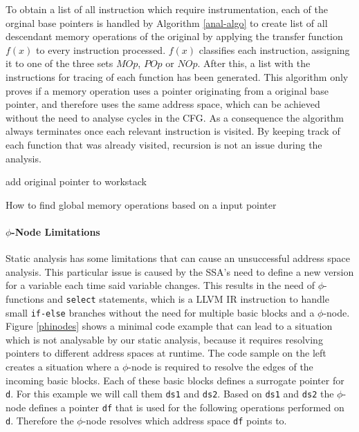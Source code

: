 To obtain a list of all instruction which require instrumentation, each of the orginal base pointers is handled by Algorithm \ref{anal-algo} to create list of all descendant memory operations of the original by applying the transfer function $f(x)$ to every instruction processed. $f(x)$ classifies each instruction, assigning it to one of the three sets $MOp$, $POp$ or $NOp$. After this, a list with the instructions for tracing of each function has been generated. This algorithm only proves if a memory operation uses a pointer originating from a original base pointer, and therefore uses the same address space, which can be achieved without the need to analyse cycles in the CFG. As a consequence the algorithm always terminates once each relevant instruction is visited. By keeping track of each function that was already visited, recursion is not an issue during the analysis.


\begin{algorithm}[t]
add original pointer to workstack\;
\caption{How to find global memory operations based on a input pointer}
\label{anal-algo}
\end{algorithm}
\paragraph{$\phi$-Node Limitations}\label{patho}
Static analysis has some limitations that can cause an unsuccessful address space analysis. This particular issue is caused by the SSA's need to define a new version for a variable each time said variable changes. This results in the need of $\phi$-functions and \verb|select| statements, which is a LLVM IR instruction to handle small \verb|if-else| branches without the need for multiple basic blocks
and a $\phi$-node. Figure \ref{phinodes} shows a minimal code example that can lead to a situation which is not analysable by our static analysis, because it requires resolving pointers to different address spaces at runtime. The code sample on the left creates a situation where a $\phi$-node is required to resolve the edges of the incoming basic blocks. Each of these basic blocks defines a surrogate pointer for \verb|d|. For this example we will call them \verb|ds1| and \verb|ds2|. Based on \verb|ds1| and \verb|ds2| the $\phi$-node defines a pointer \verb|df| that is used for the following operations performed on \verb|d|. Therefore the $\phi$-node resolves which address space \verb|df| points to. 

